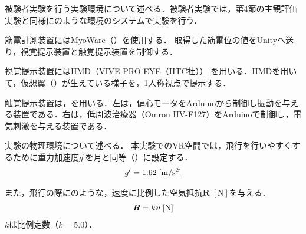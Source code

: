 \begin{small}




        被験者実験を行う実験環境について述べる．被験者実験では，第4節の主観評価実験と同様にのような環境のシステムで実験を行う．

        筋電計測装置にはMyoWare（）を使用する．
        取得した筋電位の値をUnityへ送り，視覚提示装置と触覚提示装置を制御する．

        視覚提示装置にはHMD（VIVE PRO EYE（HTC社））
        を用いる．HMDを用いて，仮想翼（）が生えている様子を，1人称視点で提示する．




        触覚提示装置は，を用いる．左は，偏心モータをArduinoから制御し振動を与える装置である．右は，低周波治療器（Omron HV-F127）をArduinoで制御し，電気刺激を与える装置である．

        実験の物理環境について述べる．
        本実験でのVR空間では，飛行を行いやすくするために重力加速度$g^{\prime}$を月と同等（）に設定する．
        \begin{eqnarray}
                \equlabel{gravity}
                g^{\prime}=1.62\;[\mathrm{m/s^{2}}]
        \end{eqnarray}

        また，飛行の際にのような，速度に比例した空気抵抗$\bm{R}\;[\mathrm{N}]$を与える．
        \begin{eqnarray}
                \equlabel{air_resistance}
                \bm{R}=k\bm{v} \;[\mathrm{N}]
        \end{eqnarray}
        $k$は比例定数（$k=5.0$）．


\end{small}

